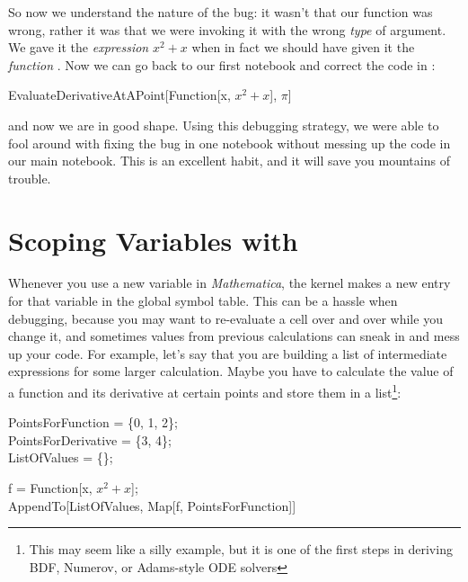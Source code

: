 So now we understand the nature of the bug: it wasn't that our  function was wrong, rather it was that we were invoking it with the wrong \emph{type} of argument. We gave it the \emph{expression} $x^2 + x$ when in fact we should have given it the \emph{function} . Now we can go back to our first notebook and correct the code in :

\begin{code}
	   EvaluateDerivativeAtAPoint[Function[x, $x^2 + x$], $\pi$]\\
\end{code}

and now we are in good shape. Using this debugging strategy, we were able to fool around with fixing the bug in one notebook without messing up the code in our main notebook. This is an excellent habit, and it will save you mountains of trouble.

\section{Scoping Variables with }
\label{sec:Scope}

Whenever you use a new variable in  \emph{Mathematica}, the kernel makes a new entry for that variable in the global symbol table. This can be a hassle when debugging, because you may want to re-evaluate a cell over and over while you change it, and sometimes values from previous calculations can sneak in and mess up your code. For example, let's say that you are building a list of intermediate expressions for some larger calculation. Maybe you have to calculate the value of a function and its derivative at certain points and store them in a list\footnote{This may seem like a silly example, but it is one of the first steps in deriving BDF, Numerov, or Adams-style ODE solvers}:

\begin{code}
	   PointsForFunction = \{0, 1, 2\};\\
	   PointsForDerivative = \{3, 4\};\\
	   ListOfValues = \{\};\\
\end{code}
	   
\begin{code}
	   f = Function[x, $x^2 + x$];\\
	   AppendTo[ListOfValues, Map[f, PointsForFunction]]\\
\end{code}
	   
